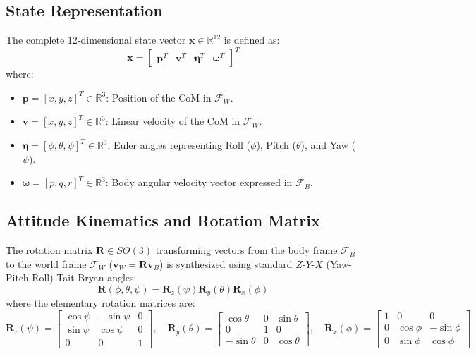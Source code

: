 \documentclass[11pt,a4paper]{article}
\begin{document}
\subsection{State Representation}
The complete 12-dimensional state vector $\mathbf{x} \in \mathbb{R}^{12}$ is defined as:
\begin{equation}
\mathbf{x} = \begin{bmatrix} \mathbf{p}^T & \mathbf{v}^T & \boldsymbol{\eta}^T & \boldsymbol{\omega}^T \end{bmatrix}^T
\end{equation}
where:
\begin{itemize}
    \item $\mathbf{p} = [x, y, z]^T \in \mathbb{R}^3$: Position of the CoM in $\mathcal{F}_W$.
    \item $\mathbf{v} = [\dot{x}, \dot{y}, \dot{z}]^T \in \mathbb{R}^3$: Linear velocity of the CoM in $\mathcal{F}_W$.
    \item $\boldsymbol{\eta} = [\phi, \theta, \psi]^T \in \mathbb{R}^3$: Euler angles representing Roll ($\phi$), Pitch ($\theta$), and Yaw ($\psi$).
    \item $\boldsymbol{\omega} = [p, q, r]^T \in \mathbb{R}^3$: Body angular velocity vector expressed in $\mathcal{F}_B$.
\end{itemize}

\subsection{Attitude Kinematics and Rotation Matrix}
The rotation matrix $\mathbf{R} \in SO(3)$ transforming vectors from the body frame $\mathcal{F}_B$ to the world frame $\mathcal{F}_W$ ($\mathbf{v}_W = \mathbf{R} \mathbf{v}_B$) is synthesized using standard $Z$-$Y$-$X$ (Yaw-Pitch-Roll) Tait-Bryan angles:
\begin{equation}
\mathbf{R}(\phi, \theta, \psi) = \mathbf{R}_z(\psi) \mathbf{R}_y(\theta) \mathbf{R}_x(\phi)
\end{equation}
where the elementary rotation matrices are:
\begin{equation}
\mathbf{R}_z(\psi) = \begin{bmatrix} \cos\psi & -\sin\psi & 0 \\ \sin\psi & \cos\psi & 0 \\ 0 & 0 & 1 \end{bmatrix}, \quad
\mathbf{R}_y(\theta) = \begin{bmatrix} \cos\theta & 0 & \sin\theta \\ 0 & 1 & 0 \\ -\sin\theta & 0 & \cos\theta \end{bmatrix}, \quad
\mathbf{R}_x(\phi) = \begin{bmatrix} 1 & 0 & 0 \\ 0 & \cos\phi & -\sin\phi \\ 0 & \sin\phi & \cos\phi \end{bmatrix}
\end{equation}
\end{document}
